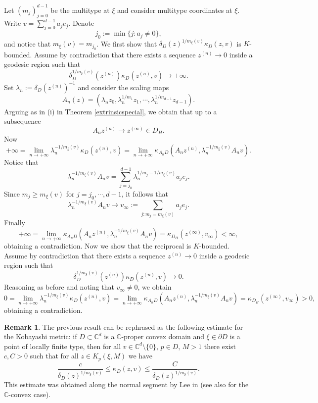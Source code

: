 \documentclass[11pt, reqno]{amsart}
\numberwithin{equation}{section}
\theoremstyle{definition}
\newtheorem{remark}[theorem]{Remark}
\newcommand{\C}{\mathbb{C}}
\begin{document}
{{{		\proof 
			Let $(m_j)_{j=0}^{d-1}$  be the multitype at $\xi$ and consider  multitype coordinates at $\xi$. 
			Write $v=\sum_{j=0}^{d-1} a_je_j$.
			Denote $$j_0:=\min\{j:a_j\neq 0\},$$ and notice that 
			$m_\xi(v)=m_{j_0}$.
			We  first show that  $\delta_D(z)^{1/m_\xi(v)}\kappa_D(z,v)$ is $K$-bounded.
			Assume by contradiction that there exists a sequence $z^{(n)}\to 0$ inside a geodesic region such that $$\delta_D^{1/m_\xi(v)}(z^{(n)})\kappa_D(z^{(n)},v)\to+\infty.$$
			Set $\lambda_n:=\delta_D(z^{(n)})^{-1}$ and consider the scaling maps
			$$A_n(z)=(\lambda_n z_0,\lambda_n^{1/m_1}z_1,\cdots,\lambda_n^{1/m_{d-1}}z_{d-1}).$$
			Arguing as in (i) in Theorem \ref{extrinsicspecial}, we obtain that up to a subsequence
			$$A_nz^{(n)}\to z^{(\infty)}\in D_H.$$
			Now
			$$+\infty=\lim_{n\to+\infty}\lambda_n^{-1/m_\xi(v)}\kappa_D(z^{(n)},v)=\lim_{n\to+\infty}\kappa_{A_nD}(A_nz^{(n)},\lambda_n^{-1/m_\xi(v)}A_nv).$$
			Notice that $$\lambda_n^{-1/m_\xi(v)}A_nv=\sum_{j=j_0}^{d-1}\lambda_n^{1/m_j-1/m_\xi(v)}a_je_j.$$
			Since $m_j\geq m_\xi(v)$ for $j=j_0,\cdots,d-1$, it follows that $$\lambda_n^{-1/m_\xi(v)}A_nv\to v_\infty:=\sum_{j\colon m_j=m_\xi(v)}a_je_j.$$ Finally
			$$+\infty=\lim_{n\to+\infty}\kappa_{A_nD}(A_nz^{(n)},\lambda_n^{-1/m_\xi(v)}A_nv)=\kappa_{D_H}(z^{(\infty)},v_\infty)<\infty,$$
			obtaining a contradiction.
			Now we show that the reciprocal is $K$-bounded. Assume by contradiction that there exists a sequence $z^{(n)}\to 0$ inside a geodesic region such that $$\delta_D^{1/m_\xi(v)}(z^{(n)})\kappa_D(z^{(n)},v)\to0.$$
			Reasoning as before and noting that $v_\infty\neq 0$, we obtain
			$$0=\lim_{n\to+\infty}\lambda_n^{-1/m_\xi(v)}\kappa_D(z^{(n)},v)=\lim_{n\to+\infty}\kappa_{A_nD}(A_nz^{(n)},\lambda_n^{-1/m_\xi(v)}A_nv)=\kappa_{D_H}(z^{(\infty)},v_\infty)>0,$$
			obtaining a contradiction.
			\endproof
		
	\begin{remark} The previous result can be rephrased as the following estimate for the Kobayashi metric: if $D\subset\C^d$ is a $\C$-proper convex domain and  $\xi\in\partial D$ is a point of locally finite type, then for all  $v\in\C^d\setminus\{0\}$, $p\in D$, $M>1$ there exist $c,C>0$ such that for all $z\in K_p(\xi,M)$ we have
$$\label{stimaLee}\frac{c}{\delta_D(z)^{1/m_\xi(v)}}\leq \kappa_D(z,v)\leq\frac{C}{\delta_D(z)^{1/m_\xi(v)}}.
$$
This estimate was obtained along the normal segment by Lee in \cite{Lee} (see also \cite{NPZ} for the $\C$-convex case).
		\end{remark}
		
}}}
\end{document}
